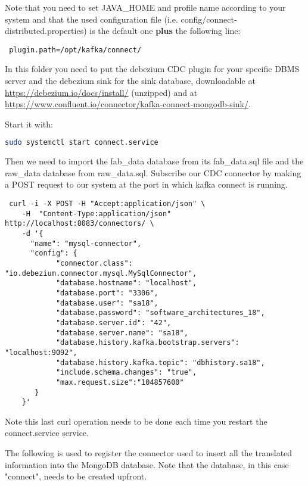 \begin{appendices}
\begin{lstlisting}
 \end{lstlisting}
 
 Note that you need to set JAVA\_HOME and profile name according to your system and that the used configuration file (i.e. config/connect-distributed.properties) is the default one \textbf{plus} the following line:
 
 \begin{lstlisting}
 plugin.path=/opt/kafka/connect/
 \end{lstlisting}
 
 In this folder you need to put the debezium CDC plugin for your specific DBMS server and the debezium sink for the sink database, downloadable at \url{https://debezium.io/docs/install/} (unzipped) and at \url{https://www.confluent.io/connector/kafka-connect-mongodb-sink/}.
 
 Start it with:
 \begin{lstlisting}[language=bash]
 sudo systemctl start connect.service
 \end{lstlisting}
 
 Then we need to import the fab\_data database from its fab\_data.sql file and the raw\_data database from raw\_data.sql. Subscribe our CDC connector by making a POST request to our system at the port in which kafka connect is running.
 
 \begin{lstlisting}
 curl -i -X POST -H "Accept:application/json" \
    -H  "Content-Type:application/json" http://localhost:8083/connectors/ \
    -d '{
      "name": "mysql-connector",
      "config": {
            "connector.class": "io.debezium.connector.mysql.MySqlConnector",
            "database.hostname": "localhost",
            "database.port": "3306",
            "database.user": "sa18",
            "database.password": "software_architectures_18",
            "database.server.id": "42",
            "database.server.name": "sa18",
            "database.history.kafka.bootstrap.servers": "localhost:9092",
            "database.history.kafka.topic": "dbhistory.sa18",
            "include.schema.changes": "true",
            "max.request.size":"104857600"
       }
    }'
 \end{lstlisting}
 
 Note this last curl operation needs to be done each time you restart the connect.service service.
 
 The following is used to register the connector used to insert all the translated information into the MongoDB database. Note that the database, in this case "connect", needs to be created upfront.
 

\end{appendices}
